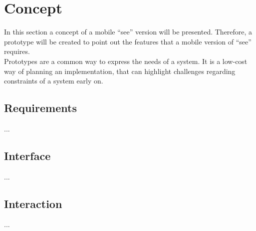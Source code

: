 \section{Concept}
In this section a concept of a mobile \enquote{\gls{see}} version will be presented. 
Therefore, a prototype will be created to point out the features that a mobile version of \enquote{\gls{see}} requires. \\
Prototypes are a common way to express the needs of a system. 
It is a low-cost way of planning an implementation, that can highlight challenges regarding constraints of a system early on.
\subsection{Requirements}
...
\subsection{Interface}
...
\subsection{Interaction}
...